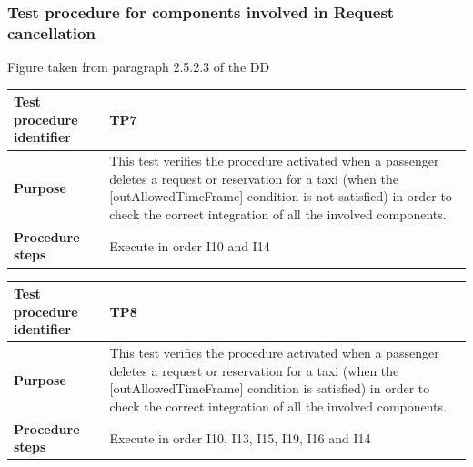 \documentclass[a4paper,11pt]{report} %
\begin{document}
			\subsubsection{Test procedure for components involved in Request cancellation}
				\begin{minipage}{\linewidth}
				\end{minipage}
				\begin{center}
					Figure taken from paragraph 2.5.2.3 of the DD
				\end{center} 			
				\begin{center}
					\begin{tabular}{| l | p{9.5cm} |}\hline
						\textbf{Test procedure identifier} & TP7\\\hline
												\textbf{Purpose} & This test verifies the procedure activated when a passenger deletes a request or reservation for a taxi (when the [outAllowedTimeFrame] condition is not satisfied) in order to check the correct integration of all the involved components.\\\hline
												\textbf{Procedure steps} & Execute in order I10 and I14 \\\hline
					\end{tabular}
				\end{center}
				\begin{center}
					\begin{tabular}{| l | p{9.5cm} |}\hline
						\textbf{Test procedure identifier} & TP8\\\hline
						\textbf{Purpose} & This test verifies the procedure activated when a passenger deletes a request or reservation for a taxi (when the [outAllowedTimeFrame] condition is satisfied) in order to check the correct integration of all the involved components.\\\hline
						\textbf{Procedure steps} & Execute in order I10, I13, I15, I19, I16 and I14 \\\hline
					\end{tabular}
				\end{center}					
		\pagebreak					
\end{document}
